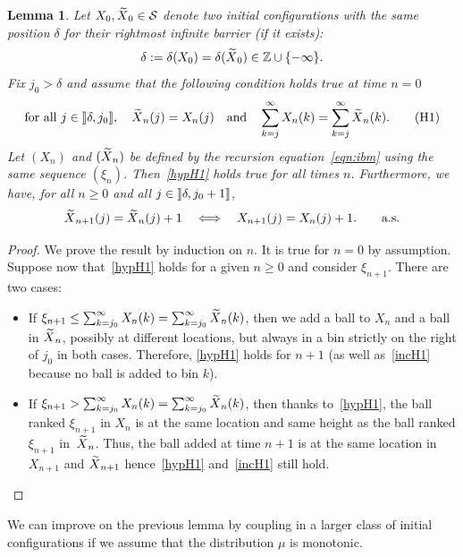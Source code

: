 \documentclass[10pt]{amsart}
\newtheorem{lemm}[theo]{Lemma}\newtheorem{prop}[theo]{Proposition}\newtheorem{coro}[theo]{Corollary}\newtheorem{conj}[theo]{Conjecture}
\theoremstyle{definition}\newtheorem{defi}[theo]{Definition}\newtheorem{rema}[theo]{Remark}\newtheorem{exam}[theo]{Example}\newtheorem{exem}[theo]{Example}\newtheorem{nota}[theo]{Notation}
\newcommand{\Z}{\mathbb{Z}}
\renewcommand{\S}{\mathcal{S}}
\let\oldin\in
\renewcommand{\in}{\mathchoice{\oldin}{\oldin}{\,\oldin\,}{\,\oldin\,}}
\let\oldtilde\tilde
\renewcommand*{\tilde}[1]{\mathchoice{\widetilde{#1}}{\widetilde{#1}}{\oldtilde{#1}}{\oldtilde{#1}}}
\newcommand{\rrbracket}{\mathclose{]\mkern -2.7mu]}}
\newcommand{\rrbracketopen}{\mathopen{]\mkern -2.7mu]}}
\newcommand{\rrb}{\rrbracket}
\begin{document}
\begin{lemm}\label{lemma:couplage1}
Let $X_0, \tilde{X}_0 \in \S$ denote two initial configurations with the same position $\delta$ for their rightmost infinite barrier (if it exists):
\[
\delta
:= \delta(X_0) = \delta(\tilde{X}_0) \in \Z\cup \{-\infty\}.
\]
Fix $j_0 > \delta$ and assume that the following condition holds true at time $n=0$
\begin{equation}
\text{for all }j \in \rrbracketopen \delta, j_0 \rrb,\quad\tilde{X}_n(j) = X_n(j) \quad\text{and}\quad \sum_{k =j}^{\infty} X_n(k) = \sum_{k= j}^{\infty} \tilde{X}_n(k).\tag{H1}\label{hypH1}
\end{equation}
Let $(X_n)$ and $(\tilde{X}_n)$ be defined by the recursion equation~\eqref{eqn:ibm} using the same sequence $(\xi_n)$. Then~\eqref{hypH1} holds true for all times $n$. Furthermore, we have, for all $n\geq 0$ and all $j\in \rrbracketopen \delta, j_0 + 1\rrb$,
\begin{equation}\label{incH1}
\tilde{X}_{n+1} (j) = \tilde{X}_{n} (j) + 1 \quad \Longleftrightarrow \quad X_{n+1} (j) = X_{n} (j) + 1.\qquad\text{a.s.}
\end{equation}
\end{lemm}
\begin{proof}
We prove the result by induction on $n$. It is true for $n=0$ by assumption. Suppose now that~\eqref{hypH1} holds for a given $n\geq 0$ and consider $\xi_{n+1}$. There are two cases:
\begin{itemize}
\item If $\xi_{n+1} \leq \sum_{k =j_0}^{\infty} X_n(k) = \sum_{k= j_0}^{\infty} \tilde{X}_n(k)$, then we add a ball to $X_n$ and a ball in $\tilde{X}_n$, possibly at different locations, but always in a bin strictly on the right of $j_0$ in both cases. Therefore, \eqref{hypH1} holds for $n+1$ (as well as~\eqref{incH1} because no ball is added to bin $k$).
\item If $\xi_{n+1} > \sum_{k =j_0}^{\infty} X_n(k) = \sum_{k= j_0}^{\infty} \tilde{X}_n(k)$, then thanks to~\eqref{hypH1}, the ball ranked $\xi_{n+1}$ in $X_n$ is at the same location and same height as the ball ranked $\xi_{n+1}$ in~$\tilde{X}_n$. Thus, the ball added at time $n+1$ is at the same location in $X_{n+1}$ and $\tilde{X}_{n+1}$ hence~\eqref{hypH1} and~\eqref{incH1} still hold.\qedhere
\end{itemize}\let\qed\relax
\end{proof}

We can improve on the previous lemma by coupling in a larger class of initial configurations if we assume that the distribution $\mu$ is monotonic.
\end{document}
